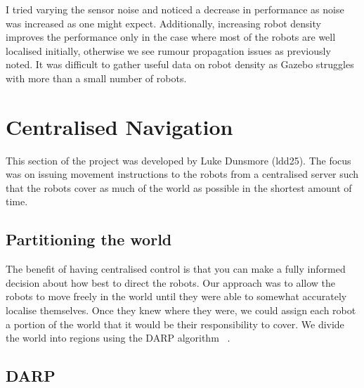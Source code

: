 \documentclass[a4paper, 10pt, conference]{ieeeconf}      %
\begin{document}
I tried varying the sensor noise and noticed a decrease in performance as noise was increased as one might expect. Additionally, increasing robot density improves the performance only in the case where most of the robots are well localised initially, otherwise we see rumour propagation issues as previously noted. It was difficult to gather useful data on robot density as Gazebo struggles with more than a small number of robots.

\section{Centralised Navigation}
This section of the project was developed by Luke Dunsmore (ldd25). The focus was on issuing movement instructions to the robots from a centralised server such that the robots cover as much of the world as possible in the shortest amount of time.

\subsection{Partitioning the world}
The benefit of having centralised control is that you can make a fully informed decision about how best to direct the robots. Our approach was to allow the robots to move freely in the world until they were able to somewhat accurately localise themselves. Once they knew where they were, we could assign each robot a portion of the world that it would be their responsibility to cover. We divide the world into regions using the DARP algorithm ~\cite{darp}.

\subsection{DARP}
\label{section:darp}
\end{document}
